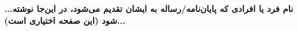 \textbf{...نام فرد یا افرادی که پایان‌نامه/رساله به ایشان تقدیم می‌شود، در این‌جا نوشته شود (این صفحه اختیاری است)...}

